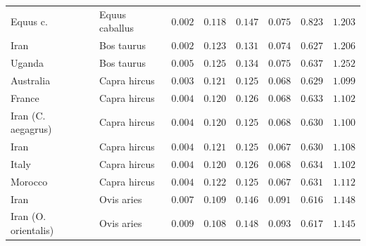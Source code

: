 \documentclass[12pt]{article}
\begin{document}
\begin{center}
\begin{longtable*}{|l|l|r|r|r|r|r|r|}
            \bottomrule
            \endlastfoot
             Equus c. &      Equus caballus &               $ 0.002$ &                    $ 0.118$ &  $ 0.147$ &            $ 0.075$ &                $ 0.823$ &           $ 1.203$ \\
            Iran &          Bos taurus &               $ 0.002$ &                    $ 0.123$ &  $ 0.131$ &            $ 0.074$ &                $ 0.627$ &           $ 1.206$ \\
            Uganda &          Bos taurus &               $ 0.005$ &                    $ 0.125$ &  $ 0.134$ &            $ 0.075$ &                $ 0.637$ &           $ 1.252$ \\
             Australia &        Capra hircus &               $ 0.003$ &                    $ 0.121$ &  $ 0.125$ &            $ 0.068$ &                $ 0.629$ &           $ 1.099$ \\
             France &        Capra hircus &               $ 0.004$ &                    $ 0.120$ &  $ 0.126$ &            $ 0.068$ &                $ 0.633$ &           $ 1.102$ \\
             Iran (C. aegagrus) &        Capra hircus &               $ 0.004$ &                    $ 0.120$ &  $ 0.125$ &            $ 0.068$ &                $ 0.630$ &           $ 1.100$ \\
             Iran &        Capra hircus &               $ 0.004$ &                    $ 0.121$ &  $ 0.125$ &            $ 0.067$ &                $ 0.630$ &           $ 1.108$ \\
             Italy &        Capra hircus &               $ 0.004$ &                    $ 0.120$ &  $ 0.126$ &            $ 0.068$ &                $ 0.634$ &           $ 1.102$ \\
             Morocco &        Capra hircus &               $ 0.004$ &                    $ 0.122$ &  $ 0.125$ &            $ 0.067$ &                $ 0.631$ &           $ 1.112$ \\
            Iran &          Ovis aries &               $ 0.007$ &                    $ 0.109$ &  $ 0.146$ &            $ 0.091$ &                $ 0.616$ &           $ 1.148$ \\
            Iran (O. orientalis) &          Ovis aries &               $ 0.009$ &                    $ 0.108$ &  $ 0.148$ &            $ 0.093$ &                $ 0.617$ &           $ 1.145$ \\

\end{longtable*}
\end{center}
\end{document}
